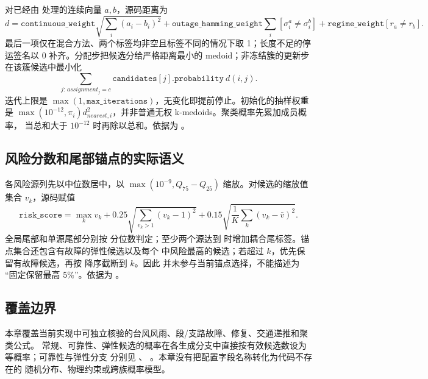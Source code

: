 对已经由  处理的连续向量 $a,b$，源码距离为
\begin{equation}
 d=\texttt{continuous\_weight}\sqrt{\sum_i(a_i-b_i)^2}
 +\texttt{outage\_hamming\_weight}\sum_i[\sigma_i^a\ne\sigma_i^b]
 +\texttt{regime\_weight}[r_a\ne r_b].
\end{equation}
最后一项仅在混合方法、两个标签均非空且标签不同的情况下取 1；长度不足的停运签名以 0
补齐。分配步把候选分给严格距离最小的 medoid；非冻结簇的更新步在该簇候选中最小化
\begin{equation}
 \sum_{j:\,assignment_j=c}\texttt{candidates}[j].\texttt{probability}\ d(i,j).
\end{equation}
迭代上限是 $\max(1,\texttt{max\_iterations})$，无变化即提前停止。初始化的抽样权重是
$\max(10^{-12},\pi_i)d_{nearest,i}^{2}$，并非普通无权 k-medoids。聚类概率先累加成员概率，
当总和大于 $10^{-12}$ 时再除以总和。依据为
。

\subsection{风险分数和尾部锚点的实际语义}

各风险源列先以中位数居中，以
$\max(10^{-9},Q_{75}-Q_{25})$ 缩放。对候选的缩放值集合 $v_k$，源码赋值
\begin{equation}
 \texttt{risk\_score}=\max_k v_k
 +0.25\sqrt{\sum_{v_k>1}(v_k-1)^2}
 +0.15\sqrt{\frac{1}{K}\sum_k(v_k-\bar v)^2}.
\end{equation}
全局尾部和单源尾部分别按  分位数判定；至少两个源达到
 时增加耦合尾标签。锚点集合还包含有故障的弹性候选以及每个
 中风险最高的候选；若超过 $k$，优先保留有故障候选，再按
 降序截断到 $k$。因此  并未参与当前锚点选择，不能描述为
“固定保留最高 5\%”。依据为 。

\subsection{覆盖边界}

本章覆盖当前实现中可独立核验的台风风雨、段/支路故障、修复、交通递推和聚类公式。
常规、可靠性、弹性候选的概率在各生成分支中直接按有效候选数设为等概率；可靠性与弹性分支
分别见 、
。本章没有把配置字段名称转化为代码不存在的
随机分布、物理约束或跨族概率模型。
